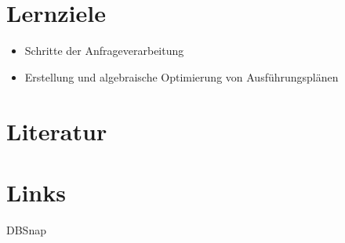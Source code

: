 \section*{Lernziele}

\begin{itemize}
	\item Schritte der Anfrageverarbeitung
	\item Erstellung und algebraische Optimierung von Ausführungsplänen
\end{itemize}

\section*{Literatur}




\section*{Links}
\begin{description}
	\item[DBSnap] \DBSnap
\end{description}
